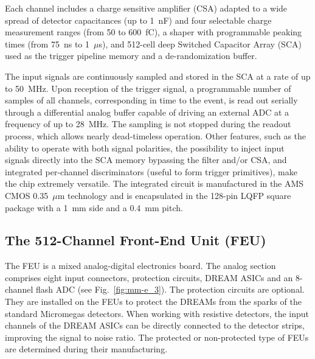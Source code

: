 Each channel includes a charge sensitive amplifier (CSA) adapted to a wide spread of detector capacitances (up to 1~nF) and
four selectable charge measurement ranges (from 50 to 600~fC), a shaper with programmable peaking times (from 75~ns to
1~$\mu$s), and 512-cell deep Switched Capacitor Array (SCA) used as the trigger pipeline memory and a de-randomization buffer.

The input signals are continuously sampled and stored in the SCA at a rate of up to 50~MHz. Upon reception of the trigger signal,
a programmable number of samples of all channels, corresponding in time to the event, is read out serially through a differential
analog buffer capable of driving an external ADC at a frequency of up to 28~MHz. The sampling is not stopped during the readout
process, which allows nearly dead-timeless operation. Other features, such as the ability to operate with both signal polarities,
the possibility to inject input signals directly into the SCA memory bypassing the filter and/or CSA, and integrated per-channel
discriminators (useful to form trigger primitives), make the chip extremely versatile. The integrated circuit is manufactured in
the AMS CMOS 0.35~$\mu$m technology and is encapsulated in the 128-pin LQFP square package with a 1~mm side and a
0.4~mm pitch.

\subsection{The 512-Channel Front-End Unit (FEU)}

The FEU is a mixed analog-digital electronics board. The analog section comprises eight input connectors, protection circuits,
DREAM ASICs and an 8-channel flash ADC (see Fig.~\ref{fig:mm-e_3}). The protection circuits are optional.  They are installed
on the FEUs to protect the DREAMs from the sparks of the standard Micromegas detectors. When working with resistive
detectors, the input channels of the DREAM ASICs can be directly connected to the detector strips, improving the signal to
noise ratio. The protected or non-protected type of FEUs are determined during their manufacturing.

